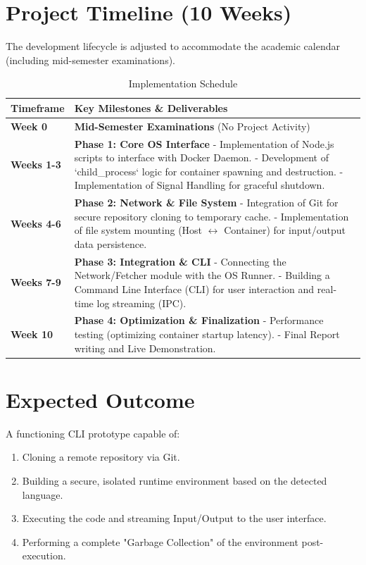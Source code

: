 \documentclass[11pt, a4paper]{article}
\begin{document}
\section{Project Timeline (10 Weeks)}
The development lifecycle is adjusted to accommodate the academic calendar (including mid-semester examinations).

\begin{table}[h]
    \centering
    \begin{tabularx}{\textwidth}{|l|X|}
    \hline
    \textbf{Timeframe} & \textbf{Key Milestones \& Deliverables} \\
    \hline
    \textbf{Week 0} & \textbf{Mid-Semester Examinations} (No Project Activity) \\
    \hline
    \textbf{Weeks 1-3} & \textbf{Phase 1: Core OS Interface} \newline
    - Implementation of Node.js scripts to interface with Docker Daemon. \newline
    - Development of `child\_process` logic for container spawning and destruction. \newline
    - Implementation of Signal Handling for graceful shutdown. \\
    \hline
    \textbf{Weeks 4-6} & \textbf{Phase 2: Network \& File System} \newline
    - Integration of Git for secure repository cloning to temporary cache. \newline
    - Implementation of file system mounting (Host $\leftrightarrow$ Container) for input/output data persistence. \\
    \hline
    \textbf{Weeks 7-9} & \textbf{Phase 3: Integration \& CLI} \newline
    - Connecting the Network/Fetcher module with the OS Runner. \newline
    - Building a Command Line Interface (CLI) for user interaction and real-time log streaming (IPC). \\
    \hline
    \textbf{Week 10} & \textbf{Phase 4: Optimization \& Finalization} \newline
    - Performance testing (optimizing container startup latency). \newline
    - Final Report writing and Live Demonstration. \\
    \hline
    \end{tabularx}
    \caption{Implementation Schedule}
\end{table}

\section{Expected Outcome}
A functioning CLI prototype capable of:
\begin{enumerate}
    \item Cloning a remote repository via Git.
    \item Building a secure, isolated runtime environment based on the detected language.
    \item Executing the code and streaming Input/Output to the user interface.
    \item Performing a complete "Garbage Collection" of the environment post-execution.
\end{enumerate}
\end{document}

